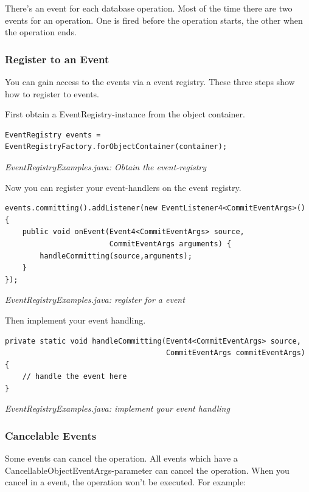 There's an event for each database operation. Most of the time there are two events for an operation. One is fired before the operation starts, the other when the operation ends.

\subsubsection*{Register to an Event}

You can gain access to the events via a event registry. These three steps show how to register to events.

First obtain a EventRegistry-instance from the object container.

\begin{lstlisting}
EventRegistry events = EventRegistryFactory.forObjectContainer(container);
\end{lstlisting}

{\small\itshape EventRegistryExamples.java: Obtain the event-registry\par}
\medskip

Now you can register your event-handlers on the event registry.

\begin{lstlisting}
events.committing().addListener(new EventListener4<CommitEventArgs>() {
    public void onEvent(Event4<CommitEventArgs> source,
                        CommitEventArgs arguments) {
        handleCommitting(source,arguments);
    }
});
\end{lstlisting}

{\small\itshape EventRegistryExamples.java: register for a event\par}
\medskip

Then implement your event handling.

\begin{lstlisting}
private static void handleCommitting(Event4<CommitEventArgs> source,
                                     CommitEventArgs commitEventArgs) {
    // handle the event here
}
\end{lstlisting}

{\small\itshape EventRegistryExamples.java: implement your event handling\par}
\medskip

\subsubsection*{Cancelable Events}

Some events can cancel the operation. All events which have a CancellableObjectEventArgs-parameter can cancel the operation. When you cancel in a event, the operation won't be executed. For example:

